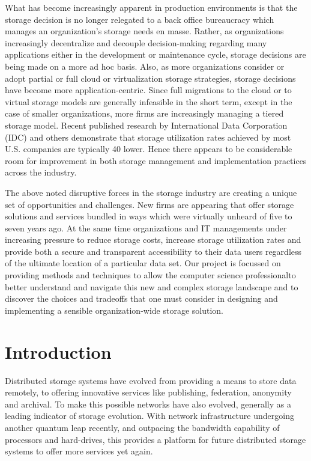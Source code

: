 \documentclass[11pt]{article}
\begin{document}
What has become increasingly apparent in production environments is 
that the storage decision is no longer relegated to a back office 
bureaucracy which manages an organization’s storage needs en masse. 
Rather, as organizations increasingly decentralize and decouple 
decision-making regarding many applications either in the development 
or maintenance cycle, storage decisions are being made on a more ad hoc 
basis. Also, as more organizations consider or adopt partial or full 
cloud or virtualization storage strategies, storage decisions have 
become more application-centric. Since full migrations to the cloud or 
to virtual storage models are generally infeasible in the short term, 
except in the case of smaller organizations, more firms are increasingly 
managing a tiered storage model. Recent published research by 
International Data Corporation (IDC) and others demonstrate that storage 
utilization rates achieved by most U.S. companies are typically 40%
lower. Hence there appears to be considerable room for improvement in 
both storage management and implementation practices across the industry. 

The above noted disruptive forces in the storage industry are creating a 
unique set of opportunities and challenges. New firms are appearing that 
offer storage solutions and services bundled in ways which were virtually 
unheard of five to seven years ago. At the same time organizations and IT 
managements under increasing pressure to reduce storage costs, increase 
storage utilization rates and provide both a secure and transparent 
accessibility to their data users regardless of the ultimate location of a 
particular data set. Our project is focussed on providing methods and 
techniques to allow the computer science professionalto better understand 
and navigate this new and complex storage landscape and to discover the 
choices and tradeoffs that one must consider in designing and implementing 
a sensible organization-wide storage solution.

\section{Introduction}
Distributed storage systems have evolved from providing a means to store data 
remotely, to offering innovative services like publishing, federation, anonymity 
and archival. To make this possible networks have also evolved, generally as a leading 
indicator of storage evolution. With network infrastructure undergoing another quantum 
leap recently, and outpacing the bandwidth capability of processors and hard-drives, 
this provides a platform for future distributed storage systems to offer more services 
yet again. 
\end{document}
